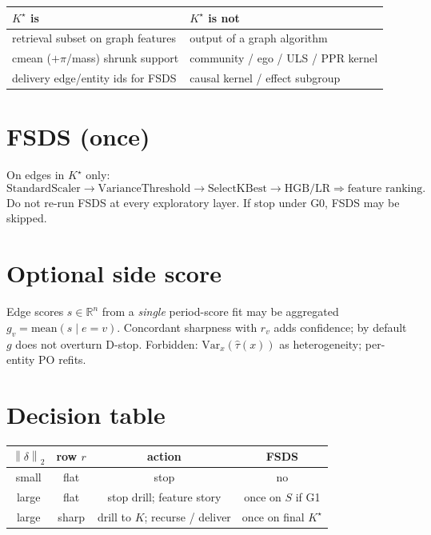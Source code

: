\documentclass[11pt]{article}
\newcommand{\R}{\mathbb{R}}
\newcommand{\norm}[1]{\left\|#1\right\|_2}
\begin{document}
\begin{center}
\begin{tabular}{@{}ll@{}}
\toprule
$K^\star$ \textbf{is} & $K^\star$ \textbf{is not} \\
\midrule
retrieval subset on graph features
  & output of a graph algorithm \\
cmean ($+\pi$/mass) shrunk support
  & community / ego / ULS / PPR kernel \\
delivery edge/entity ids for FSDS
  & causal kernel / effect subgroup \\
\bottomrule
\end{tabular}
\end{center}

\section{FSDS (once)}
\label{sec:fsds}

On edges in $K^\star$ only:
\[
  \mathrm{StandardScaler}
  \to\mathrm{VarianceThreshold}
  \to\mathrm{SelectKBest}
  \to\mathrm{HGB/LR}
  \Rightarrow\text{feature ranking}.
\]
Do not re-run FSDS at every exploratory layer.
If stop under G0, FSDS may be skipped.

\section{Optional side score}
\label{sec:po}

Edge scores $s\in\R^n$ from a \emph{single} period-score fit may be
aggregated $g_v=\mathrm{mean}(s\mid e=v)$. Concordant sharpness with
$r_v$ adds confidence; by default $g$ does not overturn D-stop.
Forbidden: $\mathrm{Var}_x(\hat\tau(x))$ as heterogeneity;
per-entity PO refits.

\section{Decision table}
\label{sec:table}

\begin{center}
\begin{tabular}{@{}cccc@{}}
\toprule
$\norm{\delta}$ & row $r$ & action & FSDS \\
\midrule
small & flat & stop & no \\
large & flat & stop drill; feature story & once on $S$ if G1 \\
large & sharp & drill to $K$; recurse / deliver & once on final $K^\star$ \\
\bottomrule
\end{tabular}
\end{center}
\end{document}
